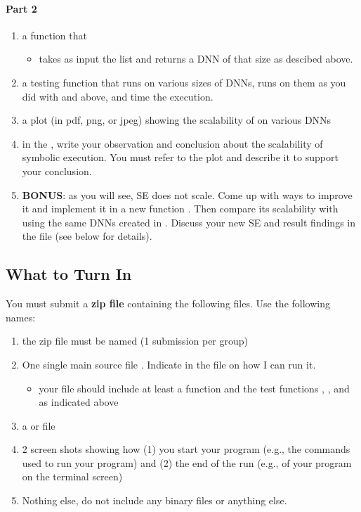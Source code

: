 \paragraph{Part 2}
\begin{enumerate}
\item a function  that
\begin{itemize}
    \item takes as input the list  and returns a DNN of that size as descibed above.
\end{itemize}
\item a testing function  that runs  on various sizes of DNNs, runs  on them as you did with  and  above, and time the execution.
\item a plot (in pdf, png, or jpeg) showing the scalability of  on various DNNs
\item in the , write your observation and conclusion about the scalability of symbolic execution.  You must refer to the plot and describe it to support your conclusion.
\item \textbf{BONUS}: as you will see, SE does not scale. Come up with ways to improve it and implement it in a new function . Then compare its scalability with  using the same DNNs created in .  Discuss your new SE and result findings in the  file (see below for details).

\end{enumerate}

\subsection{What to Turn In}

You must submit a \textbf{zip file} containing the following files. Use the following names:

\begin{enumerate}
\item the zip file must be named  (1 submission per group)
\item One single main source file . Indicate in the  file on how I can run it.
    \begin{itemize}
    \item your file should include at least a  function and the test functions , , and  as indicated above
    \end{itemize}
\item a  or  file
\item 2 screen shots showing how (1) you start your program (e.g., the commands used to run your program) and (2) the end of the run (e.g., of your program on the terminal screen)
\item Nothing else, do not include any binary files or anything else.
\end{enumerate}

